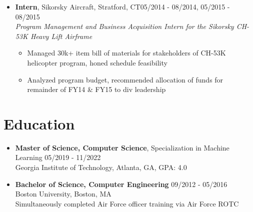 \documentclass{article}
\begin{document}
\begin{itemize}
    \item \textbf{Intern}, Sikorsky Aircraft, Stratford, CT\hfill 05/2014 - 08/2014, 05/2015 - 08/2015 \\ \emph{Program Management and Business Acquisition Intern for the Sikorsky CH-53K Heavy Lift Airframe}
    \vspace{-\topsep} \vspace{0.2em}
    \begin{itemize}
        \itemsep0em
        \item Managed 30k+ item bill of materials for stakeholders of CH-53K helicopter program, honed schedule feasibility
        \item Analyzed program budget, recommended allocation of funds for remainder of FY14 \& FY15 to div leadership
    \end{itemize} \end{itemize} 


\section{Education} \begin{itemize}
    \itemsep0.2em
    \item \textbf{Master of Science, Computer Science}, Specialization in Machine Learning \hfill 05/2019 - 11/2022\\Georgia Institute of Technology, Atlanta, GA, GPA: 4.0
    \item \textbf{Bachelor of Science, Computer Engineering} \hfill 09/2012 - 05/2016\\Boston University, Boston, MA\\Simultaneously completed Air Force officer training via Air Force ROTC  \end{itemize} 

\end{document}
